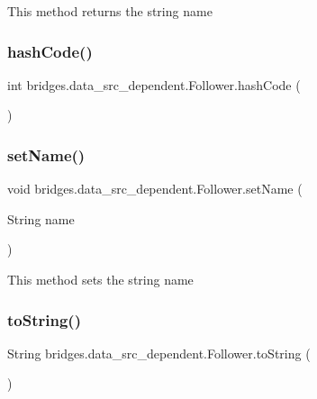 This method returns the string name \hypertarget{classbridges_1_1data__src__dependent_1_1_follower_a36f11800d7769ef93875e00afa984e19}{}\label{classbridges_1_1data__src__dependent_1_1_follower_a36f11800d7769ef93875e00afa984e19} 
\subsubsection{\texorpdfstring{hash\+Code()}{hashCode()}}
{\footnotesize\ttfamily int bridges.\+data\+\_\+src\+\_\+dependent.\+Follower.\+hash\+Code (\begin{DoxyParamCaption}{ }\end{DoxyParamCaption})}

\hypertarget{classbridges_1_1data__src__dependent_1_1_follower_a3568ebd0132d28f285448b3ce0468199}{}\label{classbridges_1_1data__src__dependent_1_1_follower_a3568ebd0132d28f285448b3ce0468199} 
\subsubsection{\texorpdfstring{set\+Name()}{setName()}}
{\footnotesize\ttfamily void bridges.\+data\+\_\+src\+\_\+dependent.\+Follower.\+set\+Name (\begin{DoxyParamCaption}\item[{String}]{name }\end{DoxyParamCaption})}

This method sets the string name \hypertarget{classbridges_1_1data__src__dependent_1_1_follower_ac01fd01fb2bbbe4eaac327bca9d6a368}{}\label{classbridges_1_1data__src__dependent_1_1_follower_ac01fd01fb2bbbe4eaac327bca9d6a368} 
\subsubsection{\texorpdfstring{to\+String()}{toString()}}
{\footnotesize\ttfamily String bridges.\+data\+\_\+src\+\_\+dependent.\+Follower.\+to\+String (\begin{DoxyParamCaption}{ }\end{DoxyParamCaption})}

